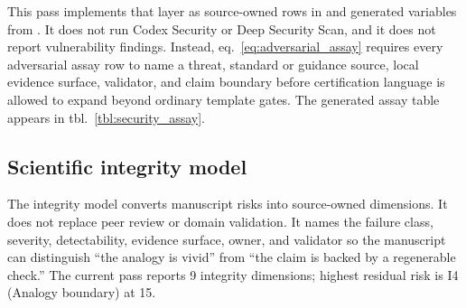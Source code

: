 \documentclass[
]{article}
\begin{document}
This pass implements that layer as source-owned rows in
 and generated variables from
. It does not run Codex Security or Deep
Security Scan, and it does not report vulnerability findings. Instead,
eq.~\ref{eq:adversarial_assay} requires every adversarial assay row to
name a threat, standard or guidance source, local evidence surface,
validator, and claim boundary before certification language is allowed
to expand beyond ordinary template gates. The generated assay table
appears in tbl.~\ref{tbl:security_assay}.

\subsection{Scientific integrity
model}\label{scientific-integrity-model}

The integrity model converts manuscript risks into source-owned
dimensions. It does not replace peer review or domain validation. It
names the failure class, severity, detectability, evidence surface,
owner, and validator so the manuscript can distinguish ``the analogy is
vivid'' from ``the claim is backed by a regenerable check.'' The current
pass reports 9 integrity dimensions; highest residual risk is I4
(Analogy boundary) at 15.
\end{document}

